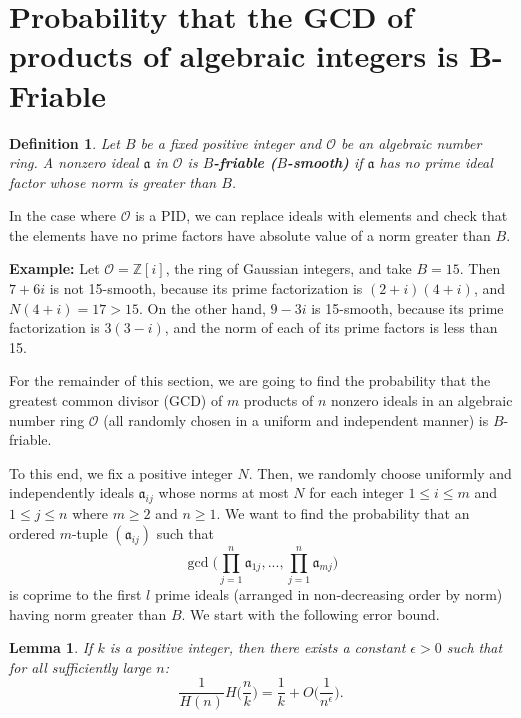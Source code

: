 \documentclass[12pt]{amsart}
\newtheorem{lemma}[theorem]{Lemma}
\newtheorem{definition}[theorem]{Definition}
\theoremstyle{definition}
\begin{document}
\section{Probability that the GCD of products of algebraic integers is B-Friable}

\begin{definition} Let $B$ be a fixed positive integer and $\mathcal{O}$ be an algebraic number ring. A nonzero ideal $\mathfrak{a}$ in $\mathcal{O}$ is \textbf{$B$-friable ($B$-smooth)} if $\mathfrak{a}$ has no prime ideal factor whose norm is greater than $B$. 
\end{definition}

In the case where $\mathcal{O}$ is a PID, we can replace ideals with elements and check that the elements have no prime factors have absolute value of a norm greater than $B$.

\noindent \textbf{Example:} Let $\mathcal{O} = \mathbb{Z}[i]$, the ring of Gaussian integers, and take $B =  15$. Then $7 + 6i$ is not 15-smooth, because its prime factorization is $(2+i)(4+i)$, and $N(4+i) = 17 > 15$. On the other hand, $9-3i$ is 15-smooth, because its prime factorization is $3(3 - i)$, and the norm of each of its prime factors is less than 15.

For the remainder of this section, we are going to find the probability that the greatest common divisor (GCD) of $m$ products of $n$ nonzero ideals in an algebraic number ring $\mathcal{O}$ (all randomly chosen in a uniform and independent manner) is $B$-friable. 

\vspace{.1 in}

To this end, we fix a positive integer $N$. Then, we randomly choose uniformly and independently ideals $\mathfrak{a}_{ij}$ whose norms at most $N$ for each integer $1 \leq i \leq m$ and $1 \leq j \leq n$ where $m \geq 2$ and $n \geq 1$. We want to find the probability that an ordered $m$-tuple $(\mathfrak{a}_{ij})$ such that 
$$\gcd\Big(\prod_{j=1}^n \mathfrak{a}_{1j}, ..., \prod_{j=1}^n \mathfrak{a}_{mj}\Big)$$
is coprime to the first $l$ prime ideals (arranged in non-decreasing order by norm) having norm greater than $B$. We start with the following error bound.

\begin{lemma}\label{H-estimate-frac} If $k$ is a positive integer, then there exists a constant $\epsilon > 0$ such that for all sufficiently large $n$:
	$$\frac{1}{H(n)} H\Big(\frac{n}{k}\Big) = \frac{1}{k} + O\Big(\frac{1}{n^{\epsilon}}\Big).$$
\end{lemma}
\end{document}
